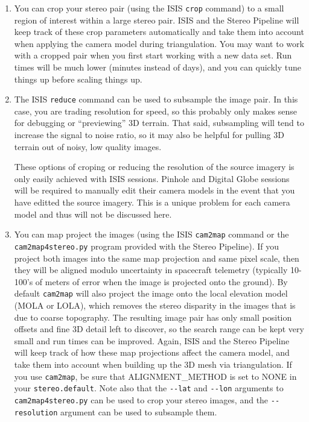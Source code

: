 \begin{enumerate}
\item You can crop your stereo pair (using the ISIS \texttt{crop}
command) to a small region of interest within a
large stereo pair.  ISIS and the Stereo Pipeline will keep track
of these crop parameters automatically and take them into account
when applying the camera model during triangulation.  You may want
to work with a cropped pair when you first start working with a new
data set.  Run times will be much lower (minutes instead of days),
and you can quickly tune things up before scaling things up.

\item The ISIS \texttt{reduce} command can be used to subsample the
image pair.  In this case, you are trading resolution for speed,
so this probably only makes sense for debugging or ``previewing'' 3D
terrain. That said, subsampling will tend to increase the signal
to noise ratio, so it may also be helpful for pulling 3D terrain
out of noisy, low quality images.

These options of croping or reducing the resolution of the source
imagery is only easily achieved with ISIS sessions. Pinhole and
Digital Globe sessions will be required to manually edit their camera
models in the event that you have editted the source imagery. This is
a unique problem for each camera model and thus will not be discussed
here.

\item You can map project the images (using the ISIS \texttt{cam2map}
command or the \texttt{cam2map4stereo.py} program provided with the
Stereo Pipeline).  If you project both images into the same map
projection and same pixel scale, then they will be aligned modulo
uncertainty in spacecraft telemetry (typically 10-100's of meters
of error when the image is projected onto the ground).  By default
\texttt{cam2map} will also project the image onto the local elevation
model (MOLA or LOLA), which removes the stereo disparity in the
images that is due to coarse topography.  The resulting image pair
has only small position offsets and fine 3D detail left to discover,
so the search range can be kept very small and run times can be
improved.  Again, ISIS and the Stereo Pipeline will keep track of
how these map projections affect the camera model, and take them
into account when building up the 3D mesh via triangulation.  If
you use \texttt{cam2map}, be sure that ALIGNMENT\_METHOD is set to
NONE in your \texttt{stereo.default}.  Note also that the \texttt{-\/-lat}
and \texttt{-\/-lon} arguments to \texttt{cam2map4stereo.py} can be
used to crop your stereo images, and the \texttt{-\/-resolution}
argument can be used to subsample them.
\end{enumerate}

